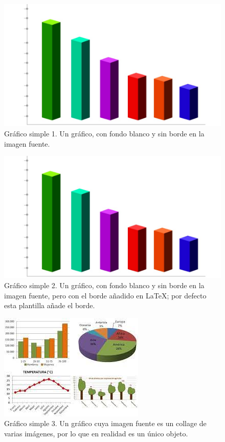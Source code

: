 \begin{figure}[H]
	\centering
	\includegraphics[scale=.5]{cuerpo/cap-objetos/imagenes/grafico-de-barras}
	\caption[Gráfico simple 1.]{Gráfico simple 1. Un gráfico, con fondo blanco y sin borde en la imagen fuente.}
	\label{fig:grafico-de-barras}
\end{figure}
%
\begin{figure}[H]
	\centering
	\includegraphics[scale=.5, frame]{cuerpo/cap-objetos/imagenes/grafico-de-barras}
	\caption[Gráfico simple 2.]{Gráfico simple 2. Un gráfico, con fondo blanco y sin borde en la imagen fuente, pero con el borde añadido en \LaTeX; por defecto esta plantilla añade el borde.}
	\label{fig:grafico-de-barras-bis}
\end{figure}
%
\begin{figure}[H]
	\centering
	\includegraphics[scale=1, frame]{cuerpo/cap-objetos/imagenes/grafico-multiple}
	\caption[Gráfico simple 3.]{Gráfico simple 3. Un gráfico cuya imagen fuente es un collage de varias imágenes, por lo que en realidad es un único objeto.}
	\label{fig:grafico-multiple}
\end{figure}
%
